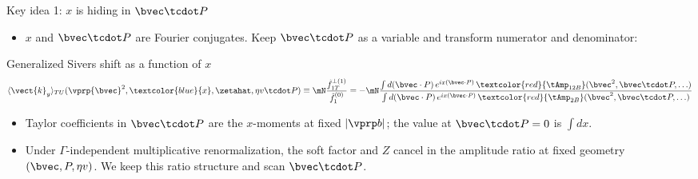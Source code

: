 \begin{frame}{Key idea 1: $x$ is hiding in $\bvec\tcdot P$}
  \begin{itemize}
    \item $x$ and $\bvec\tcdot P$ are Fourier conjugates. Keep $\bvec\tcdot P$ as a variable and transform numerator and denominator:
  \end{itemize}
  \begin{block}{Generalized Sivers shift as a function of $x$}
  \[ \langle \vect{k}_y \rangle_{TU}(\vprp{\bvec}^2,\textcolor{blue}{x},\zetahat,\eta v \tcdot P)
     \equiv \mN \frac{\tilde f_{1T}^{\perp(1)}}{\tilde f_1^{(0)}}
     = -\mN \frac{\int d(\bvec\cdot P)\,e^{ix(\bvec\cdot P)}\, \textcolor{red}{\tAmp_{12B}}(\bvec^2,\bvec \tcdot P,\ldots)}{\int d(\bvec\cdot P)\,e^{ix(\bvec\cdot P)}\,\textcolor{red}{\tAmp_{2B}}(\bvec^2,\bvec \tcdot P,\ldots)} \]
  \end{block}
  \begin{itemize}
    \item Taylor coefficients in $\bvec\tcdot P$ are the $x$-moments at fixed $|\vprp b|$; the value at $\bvec\tcdot P=0$ is $\int dx$.
    \item Under $\Gamma$-independent multiplicative renormalization, the soft factor and $Z$ cancel in the amplitude ratio at fixed geometry $(\bvec, P, \eta v)$. We keep this ratio structure and scan $\bvec\tcdot P$.
  \end{itemize}
\end{frame}

